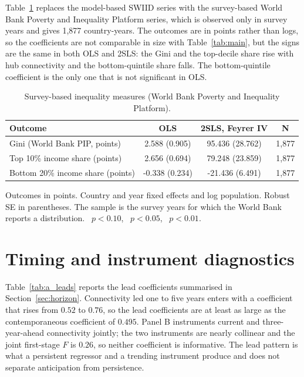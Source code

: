 Table~\ref{tab:a_altdv} replaces the model-based SWIID series with the survey-based World Bank Poverty and Inequality Platform series, which is observed only in survey years and gives 1,877 country-years. The outcomes are in points rather than logs, so the coefficients are not comparable in size with Table~\ref{tab:main}, but the signs are the same in both OLS and 2SLS: the Gini and the top-decile share rise with hub connectivity and the bottom-quintile share falls. The bottom-quintile coefficient is the only one that is not significant in OLS.

\begin{table}[H]\centering\caption{Survey-based inequality measures (World Bank Poverty and Inequality Platform).}\label{tab:a_altdv}
\begin{threeparttable}\small\begin{tabular}{lccc}
\toprule
Outcome & OLS & 2SLS, Feyrer IV & N \\
\midrule
Gini (World Bank PIP, points) & 2.588\sym{***} (0.905) & 95.436\sym{***} (28.762) & 1,877 \\
Top 10\% income share (points) & 2.656\sym{***} (0.694) & 79.248\sym{***} (23.859) & 1,877 \\
Bottom 20\% income share (points) & -0.338 (0.234) & -21.436\sym{***} (6.491) & 1,877 \\
\bottomrule
\end{tabular}
\begin{tablenotes}\footnotesize\item Outcomes in points. Country and year fixed effects and log population. Robust SE in parentheses. The sample is the survey years for which the World Bank reports a distribution. \sym{*}~$p<0.10$, \sym{**}~$p<0.05$, \sym{***}~$p<0.01$.\end{tablenotes}\end{threeparttable}\end{table}

\section{Timing and instrument diagnostics}
\label{app:timing}
Table~\ref{tab:a_leads} reports the lead coefficients summarised in Section~\ref{sec:horizon}. Connectivity led one to five years enters with a coefficient that rises from $0.52$ to $0.76$, so the lead coefficients are at least as large as the contemporaneous coefficient of $0.495$. Panel B instruments current and three-year-ahead connectivity jointly; the two instruments are nearly collinear and the joint first-stage $F$ is $0.26$, so neither coefficient is informative. The lead pattern is what a persistent regressor and a trending instrument produce and does not separate anticipation from persistence.


